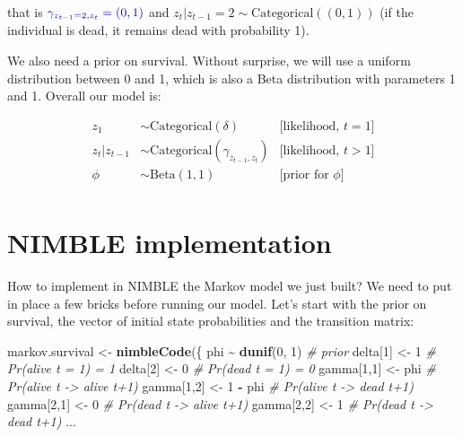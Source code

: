 \documentclass[
  12pt,
]{krantz}
\newenvironment{Shaded}{\begin{snugshade}}{\end{snugshade}}
\newcommand{\CommentTok}[1]{\textcolor[rgb]{0.56,0.35,0.01}{\textit{#1}}}
\newcommand{\DecValTok}[1]{\textcolor[rgb]{0.00,0.00,0.81}{#1}}
\newcommand{\FunctionTok}[1]{\textcolor[rgb]{0.13,0.29,0.53}{\textbf{#1}}}
\newcommand{\NormalTok}[1]{#1}
\newcommand{\OtherTok}[1]{\textcolor[rgb]{0.56,0.35,0.01}{#1}}
\newcommand{\SpecialCharTok}[1]{\textcolor[rgb]{0.81,0.36,0.00}{\textbf{#1}}}
\begin{document}
that is \(\color{blue}{\gamma_{z_{t-1} = 2,z_{t}} = (0, 1)}\) and \(z_t | z_{t-1} = 2 \sim \text{Categorical}((0, 1))\) (if the individual is dead, it remains dead with probability 1).

We also need a prior on survival. Without surprise, we will use a uniform distribution between 0 and 1, which is also a Beta distribution with parameters 1 and 1. Overall our model is:

\begin{align*}
   z_1 &\sim \text{Categorical}(\delta) &\text{[likelihood, }t = 1 \text{]}\\
   z_t | z_{t-1} &\sim \text{Categorical}(\gamma_{z_{t-1},z_{t}}) &\text{[likelihood, }t > 1 \text{]}\\
  \phi &\sim \text{Beta}(1, 1) &\text{[prior for }\phi \text{]} \\
\end{align*}

\section{NIMBLE implementation}\label{nimble-implementation}

How to implement in NIMBLE the Markov model we just built? We need to put in place a few bricks before running our model. Let's start with the prior on survival, the vector of initial state probabilities and the transition matrix:

\begin{Shaded}
\begin{Highlighting}[]
\NormalTok{markov.survival }\OtherTok{\textless{}{-}} \FunctionTok{nimbleCode}\NormalTok{(\{}
\NormalTok{  phi }\SpecialCharTok{\textasciitilde{}} \FunctionTok{dunif}\NormalTok{(}\DecValTok{0}\NormalTok{, }\DecValTok{1}\NormalTok{) }\CommentTok{\# prior}
\NormalTok{  delta[}\DecValTok{1}\NormalTok{] }\OtherTok{\textless{}{-}} \DecValTok{1}          \CommentTok{\# Pr(alive t = 1) = 1}
\NormalTok{  delta[}\DecValTok{2}\NormalTok{] }\OtherTok{\textless{}{-}} \DecValTok{0}          \CommentTok{\# Pr(dead t = 1) = 0}
\NormalTok{  gamma[}\DecValTok{1}\NormalTok{,}\DecValTok{1}\NormalTok{] }\OtherTok{\textless{}{-}}\NormalTok{ phi      }\CommentTok{\# Pr(alive t {-}\textgreater{} alive t+1)}
\NormalTok{  gamma[}\DecValTok{1}\NormalTok{,}\DecValTok{2}\NormalTok{] }\OtherTok{\textless{}{-}} \DecValTok{1} \SpecialCharTok{{-}}\NormalTok{ phi  }\CommentTok{\# Pr(alive t {-}\textgreater{} dead t+1)}
\NormalTok{  gamma[}\DecValTok{2}\NormalTok{,}\DecValTok{1}\NormalTok{] }\OtherTok{\textless{}{-}} \DecValTok{0}        \CommentTok{\# Pr(dead t {-}\textgreater{} alive t+1)}
\NormalTok{  gamma[}\DecValTok{2}\NormalTok{,}\DecValTok{2}\NormalTok{] }\OtherTok{\textless{}{-}} \DecValTok{1}        \CommentTok{\# Pr(dead t {-}\textgreater{} dead t+1)}
\NormalTok{...}
\end{Highlighting}
\end{Shaded}
\end{document}
